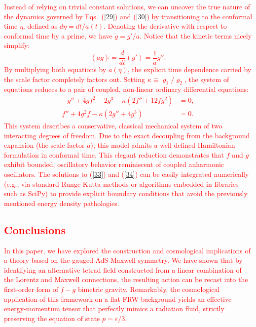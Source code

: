 \documentclass[prd,reprint,eqsecnum,nofootinbib]{revtex4-1}
\begin{document}
\textcolor{red}{
Instead of relying on trivial constant solutions, we can uncover the true nature of the dynamics governed by Eqs.~(\ref{29}) and (\ref{30}) by transitioning to the conformal time $\eta$, defined as $d\eta = dt/a(t)$. Denoting the derivative with respect to conformal time by a prime, we have $\dot{g} = g'/a$. Notice that the kinetic terms nicely simplify:
\begin{equation}
(a\dot{g})\dot{} = \frac{d}{dt}\left( g' \right) = \frac{1}{a} g''.
\end{equation}
By multiplying both equations by $a(\eta)$, the explicit time dependence carried by the scale factor completely factors out. Setting $\kappa \equiv \varrho_1 / \varrho_2$, the system of equations reduces to a pair of coupled, non-linear ordinary differential equations:
\begin{align}
-g'' + 4g f^2 - 2g^3 - \kappa (2f'' + 12fg^2) &= 0, \label{33} \\
f'' + 4g^2 f - \kappa (2g'' + 4g^3) &= 0. \label{34}
\end{align}
This system describes a conservative, classical mechanical system of two interacting degrees of freedom. Due to the exact decoupling from the background expansion (the scale factor $a$), this model admits a well-defined Hamiltonian formulation in conformal time. This elegant reduction demonstrates that $f$ and $g$ exhibit bounded, oscillatory behavior reminiscent of coupled anharmonic oscillators. The solutions to (\ref{33}) and (\ref{34}) can be easily integrated numerically (e.g., via standard Runge-Kutta methods or algorithms embedded in libraries such as SciPy) to provide explicit boundary conditions that avoid the previously mentioned energy density pathologies.
}

\textcolor{red}{
\section{Conclusions}
In this paper, we have explored the construction and cosmological implications of a theory based on the gauged AdS-Maxwell symmetry. We have shown that by identifying an alternative tetrad field constructed from a linear combination of the Lorentz and Maxwell connections, the resulting action can be recast into the first-order form of $f-g$ bimetric gravity. Remarkably, the cosmological application of this framework on a flat FRW background yields an effective energy-momentum tensor that perfectly mimics a radiation fluid, strictly preserving the equation of state $p = \varepsilon/3$. 
}
\end{document}
